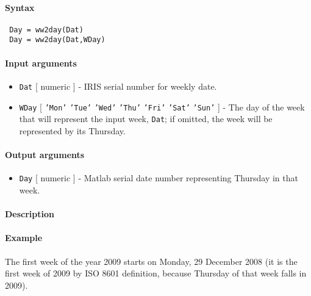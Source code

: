 


	\paragraph{Syntax}
 
 \begin{verbatim}
 Day = ww2day(Dat)
 Day = ww2day(Dat,WDay)
 \end{verbatim}
 
 \paragraph{Input arguments}
 
 \begin{itemize}
 \item
   \texttt{Dat} {[} numeric {]} - IRIS serial number for weekly date.
 \item
   \texttt{WDay} {[} \texttt{'Mon'} \textbar{} \texttt{'Tue'} \textbar{}
   \texttt{'Wed'} \textbar{} \texttt{'Thu'} \textbar{} \texttt{'Fri'}
   \textbar{} \texttt{'Sat'} \textbar{} \texttt{'Sun'} {]} - The day of
   the week that will represent the input week, \texttt{Dat}; if omitted,
   the week will be represented by its Thursday.
 \end{itemize}
 
 \paragraph{Output arguments}
 
 \begin{itemize}
 \item
   \texttt{Day} {[} numeric {]} - Matlab serial date number representing
   Thursday in that week.
 \end{itemize}
 
 \paragraph{Description}
 
 \paragraph{Example}
 
 The first week of the year 2009 starts on Monday, 29 December 2008 (it
 is the first week of 2009 by ISO 8601 definition, because Thursday of
 that week falls in 2009).
 
